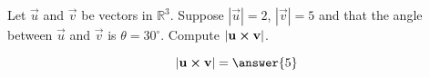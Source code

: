 \documentclass{ximera}
\author{Gregory Hartman \and Matthew Carr}
\begin{document}
\begin{exercise}



Let $\vec{u}$ and $\vec{v}$ be vectors in $\mathbb{R}^3$. Suppose $|\vec{u}|=2$, $|\vec{v}|=5$ and that the angle between $\vec{u}$ and $\vec{v}$ is $\theta=30^{\circ}$. Compute $|\mathbf{u}\boldsymbol\times\mathbf{v}|$.

\begin{prompt}
\[
|\vec{u}\cross\vec{v}|=\answer{5}
\]
\end{prompt}


\end{exercise}
\end{document}
